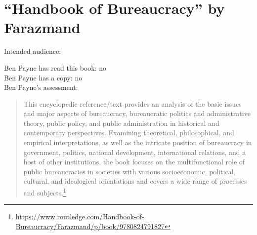 \section{``Handbook of Bureaucracy'' by Farazmand\label{review:farazmand_handbook}}

\cite{1994_Farazmand}

Intended audience:

Ben Payne has read this book: no\\
Ben Payne has a copy: no\\
Ben Payne's assessment:


\begin{quote}
    This encyclopedic reference/text provides an analysis of the basic issues and major aspects of bureaucracy, bureaucratic politics and administrative theory, public policy, and public administration in historical and contemporary perspectives. Examining theoretical, philosophical, and empirical interpretations, as well as the intricate position of bureaucracy in government, politics, national development, international relations, and a host of other institutions, the book focuses on the multifunctional role of public bureaucracies in societies with various socioeconomic, political, cultural, and ideological orientations and covers a wide range of processes and subjects.\footnote{\href{https://www.routledge.com/Handbook-of-Bureaucracy/Farazmand/p/book/9780824791827}{https://www.routledge.com/Handbook-of-Bureaucracy/Farazmand/p/book/9780824791827}}
\end{quote}
